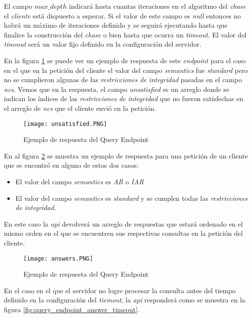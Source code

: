 \documentclass[11pt,a4paper,twoside]{tesis}
\begin{document}
El campo \textit{$max\_depth$} indicará hasta cuantas iteraciones en el algoritmo del \textit{chase} el \textit{cliente} está dispuesto a esperar. Si el valor de este campo es \textit{null} entonces no habrá un máximo de iteraciones definido y se seguirá ejecutando hasta que finalice la construcción del \textit{chase} o bien hasta que ocurra un \textit{timeout}. El valor del \textit{timeout} será un valor fijo definido en la configuración del servidor.

En la figura \ref{fig:query_endpoint_answer_2} se puede ver un ejemplo de respuesta de este \textit{endpoint} para el caso en el que en la petición del cliente el valor del campo \textit{semantics} fue \textit{standard} pero no se cumplieron algunas de las \textit{restricciones de integridad} pasadas en el campo \textit{ncs}. Vemos que en la respuesta, el campo \textit{unsatisfied} es un arreglo donde se indican los índices de las \textit{restricciones de integridad} que no fueron satisfechas en el arreglo de \textit{ncs} que el cliente envió en la petición. 


\begin{figure}[ht]
    \texttt{[image: unsatisfied.PNG]}
    \centering
    \caption{Ejemplo de respuesta del Query Endpoint}
    \label{fig:query_endpoint_answer_2}
\end{figure}


En al figura \ref{fig:query_endpoint_answer_1} se muestra un ejemplo de respuesta para una petición de un cliente que se encontró en alguno de estos dos casos:

\begin{itemize}
    \item El valor del campo \textit{semantics} es \textit{AR} o \textit{IAR}
    \item El valor del campo \textit{semantics} es \textit{standard} y se cumplen todas las \textit{restricciones de integridad}.
\end{itemize}

En este caso la \textit{api} devolverá un arreglo de respuestas que estará ordenado en el mismo orden en el que se encuentren sus respectivas consultas en la petición del cliente.

\begin{figure}[ht]
    \texttt{[image: answers.PNG]}
    \centering
    \caption{Ejemplo de respuesta del Query Endpoint}
    \label{fig:query_endpoint_answer_1}
\end{figure}

En el caso en el que el servidor no logre procesar la consulta antes del tiempo definido en la configuración del \textit{tiemout}, la \textit{api} responderá como se muestra en la figura \ref{fig:query_endpoint_answer_timeout}. 
\end{document}
